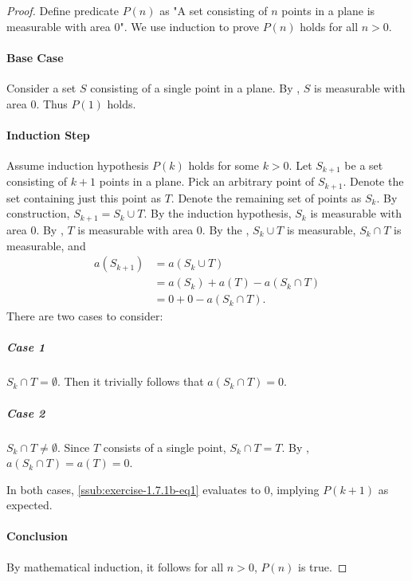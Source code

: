 \documentclass{report}
\begin{document}
\begin{proof}

  Define predicate $P(n)$ as "A set consisting of $n$ points in a plane is
    measurable with area $0$".
  We use induction to prove $P(n)$ holds for all $n > 0$.

  \paragraph{Base Case}%

    Consider a set $S$ consisting of a single point in a plane.
    By , $S$ is measurable with area $0$.
    Thus $P(1)$ holds.

  \paragraph{Induction Step}%

    Assume induction hypothesis $P(k)$ holds for some $k > 0$.
    Let $S_{k+1}$ be a set consisting of $k + 1$ points in a plane.
    Pick an arbitrary point of $S_{k+1}$.
    Denote the set containing just this point as $T$.
    Denote the remaining set of points as $S_k$.
    By construction, $S_{k+1} = S_k \cup T$.
    By the induction hypothesis, $S_k$ is measurable with area $0$.
    By , $T$ is measurable with area $0$.
    By the , $S_k \cup T$ is
      measurable, $S_k \cap T$ is measurable, and
      \begin{align}
        a(S_{k+1})
          & = a(S_k \cup T) \nonumber \\
          & = a(S_k) + a(T) - a(S_k \cap T) \nonumber \\
          & = 0 + 0 - a(S_k \cap T). \label{ssub:exercise-1.7.1b-eq1}
      \end{align}
    There are two cases to consider:

    \subparagraph{Case 1}%

      $S_k \cap T = \emptyset$.
      Then it trivially follows that $a(S_k \cap T) = 0$.

    \subparagraph{Case 2}%

      $S_k \cap T \neq \emptyset$.
      Since $T$ consists of a single point, $S_k \cap T = T$.
      By , $a(S_k \cap T) = a(T) = 0$.

    \vspace{8pt}
    \noindent
    In both cases, \eqref{ssub:exercise-1.7.1b-eq1} evaluates to $0$, implying
      $P(k + 1)$ as expected.

  \paragraph{Conclusion}%

    By mathematical induction, it follows for all $n > 0$, $P(n)$ is true.

\end{proof}
\end{document}

